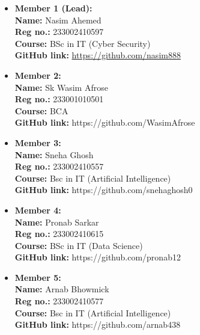 \documentclass{article}
\begin{document}
\begin{multicols}{2}
    \begin{itemize}[leftmargin=*]
        \item \textbf{Member 1 (Lead):}\\
        \textbf{Name:} Nasim Ahemed \\
        \textbf{Reg no.:} 233002410597\\
        \textbf{Course:} BSc in IT (Cyber Security)\\
        \textbf{GitHub link:} \url{https://github.com/nasim888}
    \end{itemize}
    \vspace{0.5cm}
    \begin{itemize}[leftmargin=*]
        \item \textbf{Member 2:}\\
        \textbf{Name:} Sk Wasim Afrose\\
        \textbf{Reg no.:} 233001010501\\
        \textbf{Course:} BCA \\
        \textbf{GitHub link:} https://github.com/WasimAfrose
    \end{itemize}

    \vfill

    \begin{itemize}[leftmargin=*]
        \item \textbf{Member 3:}\\
        \textbf{Name:} Sneha Ghosh\\
        \textbf{Reg no.:} 233002410557\\
        \textbf{Course:} Bsc in IT (Artificial Intelligence)\\
        \textbf{GitHub link:} https://github.com/snehaghosh0
    \end{itemize}
    \vspace{0.5cm}
    \begin{itemize}[leftmargin=*]
        \item \textbf{Member 4:}\\
        \textbf{Name:} Pronab Sarkar \\
        \textbf{Reg no.:} 233002410615\\
        \textbf{Course:} BSc in IT (Data Science)\\
        \textbf{GitHub link:} https://github.com/pronab12
    \end{itemize}

    \vfill

    \begin{itemize}[leftmargin=*]
        \item \textbf{Member 5:}\\
        \textbf{Name:} Arnab Bhowmick\\
        \textbf{Reg no.:} 233002410577\\
        \textbf{Course:} Bsc in IT (Artificial Intelligence)\\
        \textbf{GitHub link:} https://github.com/arnab438
    \end{itemize}
\end{multicols}
\end{document}
